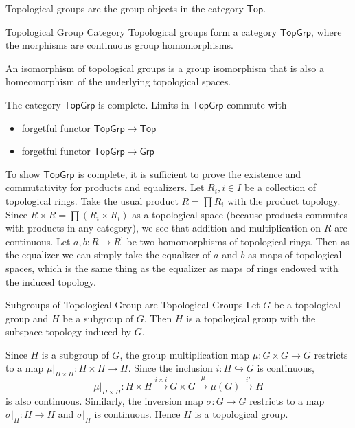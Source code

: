 \documentclass{report}
\begin{document}
\noindent Topological groups are the group objects in the category $\mathsf{Top}$.
\begin{definition}{Topological Group Category}{}
	Topological groups form a category $\mathsf{TopGrp}$, where the morphisms are continuous group homomorphisms.
\end{definition}


\noindent An isomorphism of topological groups is a group isomorphism that is also a homeomorphism of the underlying topological spaces.
\begin{proposition}{}{}
	The category $\mathsf{TopGrp}$ is complete. Limits in $\mathsf{TopGrp}$ commute with
	\begin{itemize}
		\item forgetful functor $\mathsf{TopGrp}\to\mathsf{Top}$
		\item forgetful functor $\mathsf{TopGrp}\to\mathsf{Grp}$
	\end{itemize}
\end{proposition}

\begin{prf}
	To show $\mathsf{TopGrp}$ is complete, it is sufficient to prove the existence and commutativity for products and equalizers. Let $R_i, i \in I$ be a collection of topological rings. Take the usual product $R=\prod R_i$ with the product topology. Since $R \times R=\prod\left(R_i \times R_i\right)$ as a topological space (because products commutes with products in any category), we see that addition and multiplication on $R$ are continuous. Let $a, b: R \rightarrow R^{\prime}$ be two homomorphisms of topological rings. Then as the equalizer we can simply take the equalizer of $a$ and $b$ as maps of topological spaces, which is the same thing as the equalizer as maps of rings endowed with the induced topology.
\end{prf}


\begin{proposition}{Subgroups of Topological Group are Topological Groups}{}
	Let $G$ be a topological group and $H$ be a subgroup of $G$. Then $H$ is a topological group with the subspace topology induced by $G$.
\end{proposition}

\begin{prf}
	Since $H$ is a subgroup of $G$, the group multiplication map $\mu:G\times G\to G$ restricts to a map $\mu|_{H\times H}:H\times H\to H$. Since the inclusion $i:H\hookrightarrow G$ is continuous,
	\[
		\mu|_{H\times H}:H \times H \xrightarrow{i\times i} G\times G\xrightarrow{\mu}\mu(G)  \xrightarrow{i'} H
	\]
	is also continuous. Similarly, the inversion map $\sigma:G\to G$ restricts to a map $\sigma|_H:H\to H$ and $\sigma|_H$ is continuous. Hence $H$ is a topological group.

\end{prf}
\end{document}
